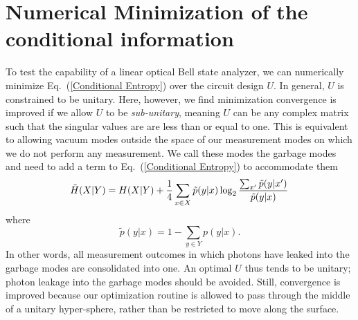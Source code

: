 \documentclass[aps,pra,twocolumn,showpacs,superscriptaddress,floatfix,10pt]{revtex4}
\begin{document}
\section{Numerical Minimization of the conditional information}
\label{Section on Numerical Minimization}
To test the capability of a linear optical Bell state analyzer, we can numerically minimize Eq.~(\ref{Conditional Entropy}) over the circuit design $U$. In general, $U$ is constrained to be unitary. Here, however, we find minimization convergence is improved if we allow $U$ to be \textit{sub-unitary}, meaning $U$ can be any complex matrix such that the singular values are are less than or equal to one. This is equivalent to allowing vacuum modes outside the space of our measurement modes on which we do not perform any measurement. We call these modes the garbage modes and need to add a term to Eq.~(\ref{Conditional Entropy}) to accommodate them
\begin{equation}
\label{Condition Information with Garbage modes}
\small	\tilde{H}(X|Y) = H(X|Y) +  \frac{1}{4} \sum_{x \in X} \tilde{p}(y|x) \log_2 \frac{\sum_{x^\prime} \tilde{p}(y|x^\prime)}{\tilde{p}(y|x)}\,
\end{equation}
where
\begin{equation}
	\tilde{p}(y|x) = 1 - \sum_{y \in Y} p(y|x).
\end{equation}
In other words, all measurement outcomes in which photons have leaked into the garbage modes are consolidated into one. An optimal $U$ thus tends to be unitary; photon leakage into the garbage modes should be avoided. Still, convergence is improved because our optimization routine is allowed to pass through the middle of a unitary hyper-sphere, rather than be restricted to move along the surface.
\end{document}
